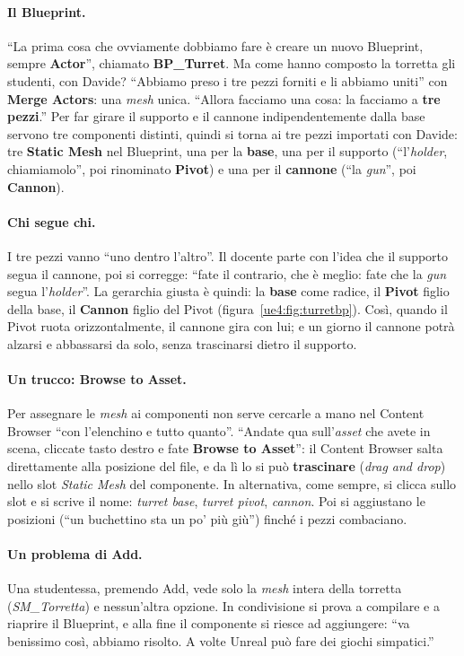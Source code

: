 \paragraph{Il Blueprint.} ``La prima cosa che ovviamente dobbiamo fare è creare un
nuovo Blueprint, sempre \textbf{Actor}'', chiamato \textbf{BP\_Turret}. Ma come hanno
composto la torretta gli studenti, con Davide? ``Abbiamo preso i tre pezzi forniti e li
abbiamo uniti'' con \textbf{Merge Actors}: una \emph{mesh} unica. ``Allora facciamo una
cosa: la facciamo a \textbf{tre pezzi}.'' Per far girare il supporto e il cannone
indipendentemente dalla base servono tre componenti distinti, quindi si torna ai tre
pezzi importati con Davide: tre \textbf{Static Mesh} nel Blueprint, una per la
\textbf{base}, una per il supporto (``l'\emph{holder}, chiamiamolo'', poi rinominato
\textbf{Pivot}) e una per il \textbf{cannone} (``la \emph{gun}'', poi
\textbf{Cannon}).

\paragraph{Chi segue chi.} I tre pezzi vanno ``uno dentro l'altro''. Il docente parte
con l'idea che il supporto segua il cannone, poi si corregge: ``fate il contrario, che
è meglio: fate che la \emph{gun} segua l'\emph{holder}''. La gerarchia giusta è quindi:
la \textbf{base} come radice, il \textbf{Pivot} figlio della base, il \textbf{Cannon}
figlio del Pivot (figura~\ref{ue4:fig:turretbp}). Così, quando il Pivot ruota
orizzontalmente, il cannone gira con lui; e un giorno il cannone potrà alzarsi e
abbassarsi da solo, senza trascinarsi dietro il supporto.

\paragraph{Un trucco: Browse to Asset.} Per assegnare le \emph{mesh} ai componenti non
serve cercarle a mano nel Content Browser ``con l'elenchino e tutto quanto''. ``Andate
qua sull'\emph{asset} che avete in scena, cliccate tasto destro e fate \textbf{Browse to
Asset}'': il Content Browser salta direttamente alla posizione del file, e da lì lo si
può \textbf{trascinare} (\emph{drag and drop}) nello slot \emph{Static Mesh} del
componente. In alternativa, come sempre, si clicca sullo slot e si scrive il nome:
\emph{turret base}, \emph{turret pivot}, \emph{cannon}. Poi si aggiustano le posizioni
(``un buchettino sta un po' più giù'') finché i pezzi combaciano.

\paragraph{Un problema di Add.} Una studentessa, premendo Add, vede solo la \emph{mesh}
intera della torretta (\emph{SM\_\allowbreak Torretta}) e nessun'altra opzione. In condivisione si
prova a compilare e a riaprire il Blueprint, e alla fine il componente si riesce ad
aggiungere: ``va benissimo così, abbiamo risolto. A volte Unreal può fare dei giochi
simpatici.''

